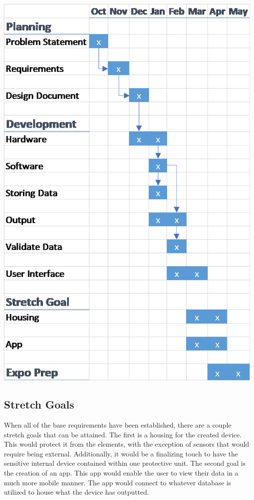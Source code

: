 \documentclass[IEEEtran,letterpaper,10pt,titlepage,fleqn,draftclsnofoot,onecolumn]{article}
\begin{document}
\includegraphics{Gantt_Chart}

\subsection{Stretch Goals}

When all of the base requirements have been established, there are a couple stretch goals that can be attained. The first is a housing for the created device. This would protect it from the elements, with the exception of sensors that would require being external. Additionally, it would be a finalizing touch to have the sensitive internal device contained within one protective unit. The second goal is the creation of an app. This app would enable the user to view their data in a much more mobile manner. The app would connect to whatever database is utilized to house what the device has outputted.
\end{document}
